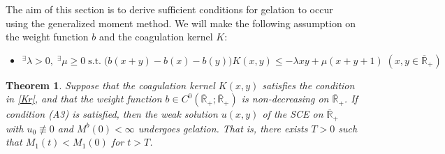 \documentclass[a4paper,11pt]{article}
\newtheorem{thm}{Theorem}[section]
\def\Rb{\overline{{\mathbb R}}_+}
\begin{document}
The aim of this section is to derive sufficient conditions for gelation to occur using the generalized moment method.
We will make the following assumption on the weight function $b$ and the coagulation kernel $K$:
\begin{itemize} 
\item[(A3)] 
${}^\exists \lambda >0,\;{}^\exists \mu\ge 0\; \mathrm{s.t.}\; \big(b(x+y)-b(x)-b(y)\big)K(x,y)\le -\lambda xy+\mu (x+y+1)\;(x,y\in\Rb)$
\end{itemize}
\begin{thm}\label{mainth}
Suppose that the coagulation kernel $K(x,y)$ satisfies the condition in \eqref{Kr}, and that the weight function $b\in C^0(\Rb;\Rb)$ is non-decreasing on $\Rb$. If condition (A3) is satisfied, then the weak solution $u(x,y)$ of the SCE on $\Rb$ with $u_0\not\equiv 0$ and $M^b(0)<\infty$ undergoes gelation. That is, there exists $T>0$ such that $M_1(t)<M_1(0)$ for $t>T$. 
\end{thm}
\end{document}
